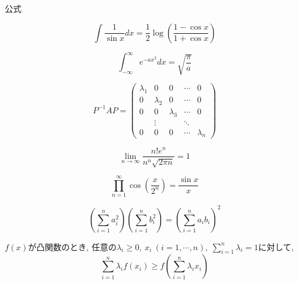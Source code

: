 \documentclass{jarticle}
\begin{document}
 公式
 
 $$\int \frac{1}{\sin x} dx =
 \frac{1}{2} \log \left( \frac{1-\cos x}{1+\cos x} \right)$$

 $$\int_{-\infty}^{\infty} e^{-ax^2} dx = \sqrt{\frac{\pi}{a}}$$

 \begin{equation*}
  P^{-1}AP =
   \left(
    \begin{array}{ccccc}
     \lambda_1 & 0 & 0 & \cdots & 0 \\
     0 & \lambda_2 & 0 & \cdots & 0 \\
     0 & 0 & \lambda_3 & \cdots & 0 \\
      & \vdots &  & \ddots &  \\
     0 & 0 & 0 & \cdots & \lambda_n
    \end{array}
  \right)
 \end{equation*}

 $$\lim_{n \to \infty} \frac{n!e^n}{n^n \sqrt{2 \pi n}} = 1$$

 $$\prod_{n=1}^{\infty} \cos \left( \frac{x}{2^n} \right)
 = \frac{\sin x}{x}$$

 $$\left( \sum_{i=1}^{n} a_i^2 \right)
 \left( \sum_{i=1}^{n} b_i^2 \right)
  = \left( \sum_{i=1}^{n} a_i b_i \right)^2$$

  $f(x)$が凸関数のとき,
  任意の$\lambda_i \geq 0,\ x_i\ (i=1,\cdots,n),\
  \sum_{i=1}^n \lambda_i = 1$に対して,
  $$\sum_{i=1}^n \lambda_i f(x_i) \geq
  f\left( \sum_{i=1}^n \lambda_i x_i \right)$$
 
\end{document}
